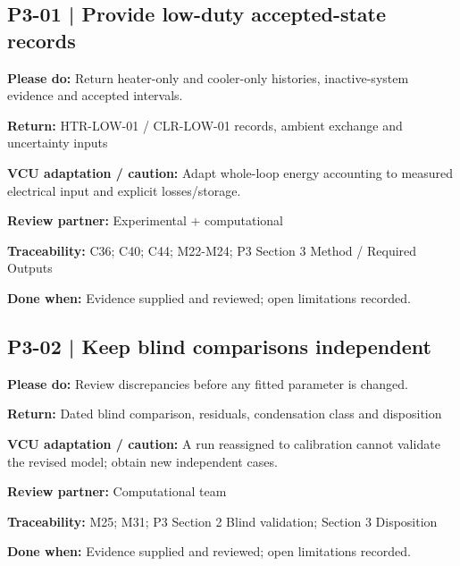 \documentclass[11pt]{article}
\begin{document}
\begin{minipage}{\textwidth}\small\setlength{\parskip}{2pt}
\subsection*{P3-01 | Provide low-duty accepted-state records}
\textbf{Please do:} Return heater-only and cooler-only histories, inactive-system evidence and accepted intervals.\par
\textbf{Return:} HTR-LOW-01 / CLR-LOW-01 records, ambient exchange and uncertainty inputs\par
\textbf{VCU adaptation / caution:} Adapt whole-loop energy accounting to measured electrical input and explicit losses/storage.\par
\textbf{Review partner:} Experimental + computational\par
\textbf{Traceability:} C36; C40; C44; M22-M24; P3 Section 3 Method / Required Outputs\par
\textbf{Done when:} Evidence supplied and reviewed; open limitations recorded.\par
\end{minipage}\par\vspace{8pt}
\begin{minipage}{\textwidth}\small\setlength{\parskip}{2pt}
\subsection*{P3-02 | Keep blind comparisons independent}
\textbf{Please do:} Review discrepancies before any fitted parameter is changed.\par
\textbf{Return:} Dated blind comparison, residuals, condensation class and disposition\par
\textbf{VCU adaptation / caution:} A run reassigned to calibration cannot validate the revised model; obtain new independent cases.\par
\textbf{Review partner:} Computational team\par
\textbf{Traceability:} M25; M31; P3 Section 2 Blind validation; Section 3 Disposition\par
\textbf{Done when:} Evidence supplied and reviewed; open limitations recorded.\par
\end{minipage}\par\vspace{8pt}
\end{document}
